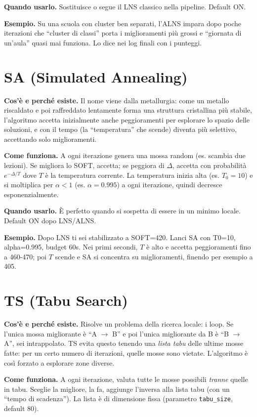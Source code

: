 \textbf{Quando usarlo.} Sostituisce o segue il LNS classico
nella pipeline. Default ON.

\textbf{Esempio.} Su una scuola con cluster ben separati,
l'ALNS impara dopo poche iterazioni che ``cluster di classi''
porta i miglioramenti pi\`u grossi e ``giornata di un'aula''
quasi mai funziona. Lo dice nei log finali con i punteggi.

\section{SA (Simulated Annealing)}

\textbf{Cos'\`e e perch\'e esiste.} Il nome viene dalla
metallurgia: come un metallo riscaldato e poi raffreddato
lentamente forma una struttura cristallina pi\`u stabile,
l'algoritmo accetta inizialmente anche peggioramenti per
esplorare lo spazio delle soluzioni, e con il tempo (la
``temperatura'' che scende) diventa pi\`u selettivo,
accettando solo miglioramenti.

\textbf{Come funziona.} A ogni iterazione genera una mossa
random (es. scambia due lezioni). Se migliora lo SOFT, accetta;
se peggiora di $\Delta$, accetta con probabilit\`a
$e^{-\Delta/T}$ dove $T$ \`e la temperatura corrente. La
temperatura inizia alta (es. $T_0 = 10$) e si moltiplica per
$\alpha < 1$ (es. $\alpha = 0.995$) a ogni iterazione, quindi
decresce esponenzialmente.

\textbf{Quando usarlo.} \`E perfetto quando si sospetta di
essere in un minimo locale. Default ON dopo LNS/ALNS.

\textbf{Esempio.} Dopo LNS ti sei stabilizzato a SOFT=420.
Lanci SA con T0=10, alpha=0.995, budget 60s. Nei primi
secondi, $T$ \`e alto e accetta peggioramenti fino a 460-470;
poi $T$ scende e SA si concentra su miglioramenti, finendo
per esempio a 405.

\section{TS (Tabu Search)}

\textbf{Cos'\`e e perch\'e esiste.} Risolve un problema della
ricerca locale: i loop. Se l'unica mossa migliorante
\`e ``A $\to$ B'' e poi l'unica migliorante da B \`e ``B
$\to$ A'', sei intrappolato. TS evita questo tenendo una
\emph{lista tabu} delle ultime mosse fatte: per un certo
numero di iterazioni, quelle mosse sono vietate. L'algoritmo
\`e cos\`i forzato a esplorare zone diverse.

\textbf{Come funziona.} A ogni iterazione, valuta tutte le
mosse possibili \emph{tranne} quelle in tabu. Sceglie la
migliore, la fa, aggiunge l'inversa alla lista tabu (con un
``tempo di scadenza''). La lista \`e di dimensione fissa
(parametro \texttt{tabu\_size}, default 80).

